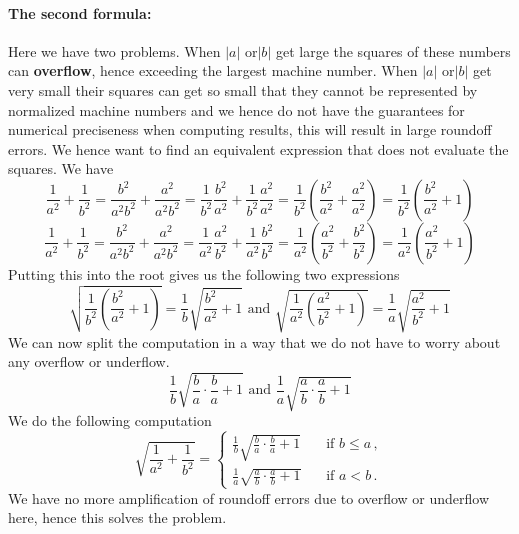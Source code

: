 \documentclass{article}
\begin{document}
\paragraph{The second formula:} Here we have two problems. When $\left\lvert a \right\rvert$ or$\left\lvert b\right\rvert$ get large the squares of these numbers can \textbf{overflow}, hence exceeding the largest machine number. When $\left\lvert a \right\rvert$ or$\left\lvert b\right\rvert$ get very small their squares can get so small that they cannot be represented by normalized machine numbers and we hence do not have the guarantees for numerical preciseness when computing results, this will result in large roundoff errors. We hence want to find an equivalent expression that does not evaluate the squares. We have
\begin{equation*}
    \frac{1}{a^{2}} + \frac{1}{b^{2}} = \frac{b^{2}}{a^{2}b^{2}} + \frac{a^{2}}{a^{2}b^{2}} = \frac{1}{b^{2}}\frac{b^{2}}{a^{2}} + \frac{1}{b^{2}}\frac{a^{2}}{a^{2}} = \frac{1}{b^{2}}\left(\frac{b^{2}}{a^{2}} + \frac{a^{2}}{a^{2}}\right) = \frac{1}{b^{2}}\left(\frac{b^{2}}{a^{2}} + 1\right)
\end{equation*}
\begin{equation*}
    \frac{1}{a^{2}} + \frac{1}{b^{2}} = \frac{b^{2}}{a^{2}b^{2}} + \frac{a^{2}}{a^{2}b^{2}} =\frac{1}{a^{2}}\frac{a^{2}}{b^{2}} + \frac{1}{a^{2}}\frac{b^{2}}{b^{2}} = \frac{1}{a^{2}}\left(\frac{a^{2}}{b^{2}} + \frac{b^{2}}{b^{2}}\right) = \frac{1}{a^{2}}\left(\frac{a^{2}}{b^{2}}+1\right)
\end{equation*}
Putting this into the root gives us the following two expressions
\begin{equation*}
    \sqrt{\frac{1}{b^{2}}\left(\frac{b^{2}}{a^{2}} + 1\right)} = \frac{1}{b}\sqrt{\frac{b^{2}}{a^{2}} + 1} \text{ and } \sqrt{\frac{1}{a^{2}}\left(\frac{a^{2}}{b^{2}}+1\right)} = \frac{1}{a}\sqrt{\frac{a^{2}}{b^{2}}+1}
\end{equation*}
We can now split the computation in a way that we do not have to worry about any overflow or underflow.
\begin{equation*}
    \frac{1}{b}\sqrt{\frac{b}{a}\cdot \frac{b}{a} + 1} \text{ and } \frac{1}{a}\sqrt{\frac{a}{b}\cdot \frac{a}{b} +1}
\end{equation*}
We do the following computation
\begin{equation*}
    \sqrt{ \frac{1}{a^{2}} + \frac{1}{b^{2}}} = 
    \begin{cases}
    \frac{1}{b}\sqrt{\frac{b}{a}\cdot \frac{b}{a} + 1} \quad &\text{if } b \leq a \, , \\[2mm]
    \frac{1}{a}\sqrt{\frac{a}{b}\cdot \frac{a}{b} +1} &\text{if } a<  b \, .
    \end{cases}
\end{equation*}
We have no more amplification of roundoff errors due to overflow or underflow here, hence this solves the problem.
\end{document}
